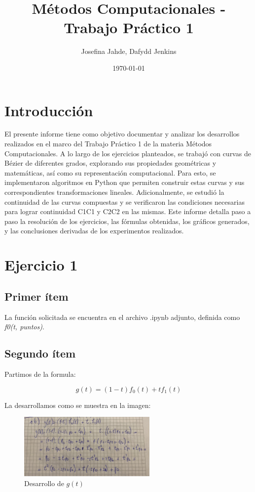 \documentclass{article}
\title{Métodos Computacionales - Trabajo Práctico 1}
\author{Josefina Jahde, Dafydd Jenkins}
\date{\today}
\begin{document}
\maketitle

\section*{Introducción}
El presente informe tiene como objetivo documentar y analizar los desarrollos realizados en el marco del Trabajo Práctico 1 de la materia Métodos Computacionales. A lo largo de los ejercicios planteados, se trabajó con curvas de Bézier de diferentes grados, explorando sus propiedades geométricas y matemáticas, así como su representación computacional. Para esto, se implementaron algoritmos en Python que permiten construir estas curvas y sus correspondientes transformaciones lineales. Adicionalmente, se estudió la continuidad de las curvas compuestas y se verificaron las condiciones necesarias para lograr continuidad C1C1 y C2C2 en las mismas. Este informe detalla paso a paso la resolución de los ejercicios, las fórmulas obtenidas, los gráficos generados, y las conclusiones derivadas de los experimentos realizados.


\section*{Ejercicio 1}
\subsection*{Primer ítem}
La función solicitada se encuentra en el archivo .ipynb adjunto, definida como \textit{f0(t, puntos)}.
\subsection*{Segundo ítem}
Partimos de la formula:

$$
g(t) = (1 - t)f_0(t) + t f_1(t)
$$

La desarrollamos como se muestra en la imagen:

\begin{figure}[H]
    \centering
    \includegraphics[width=0.6\textwidth]{imagenes/1b.jpg}
    \caption{Desarrollo de $g(t)$}
    \label{fig:ejemplo}
\end{figure}
\end{document}
